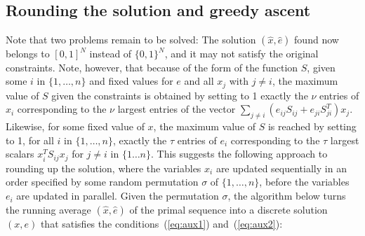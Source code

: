 \documentclass[10pt,twocolumn,letterpaper]{article}
\numberwithin{theorem}{section}
\begin{document}
\subsection{Rounding the solution and greedy ascent}
Note that two problems remain to be solved: The solution $(\hat{x},\hat{e})$ found
now belongs to $[0,1]^N$ instead of $\{0,1\}^N$, and it may not
satisfy the original constraints. Note, however, that because of the
form of the function $S$, given some $i$ in $\{1,\ldots,n\}$ and fixed
values for $e$ and all $x_j$ with $j\neq i$, the maximum value of $S$
given the constraints is obtained by setting to 1 exactly the $\nu$
entries of $x_i$ corresponding to the $\nu$ largest entries of the
vector $\sum_{j\neq i} (e_{ij}S_{ij}+e_{ji}S_{ji}^T)x_j$. Likewise,
for some fixed value of $x$, the maximum value of $S$ is reached by
setting to 1, for all $i$ in $\{1,\ldots,n\}$, exactly the $\tau$ entries of
$e_i$ corresponding to the $\tau$ largest scalars $x_i^TS_{ij}x_j$ for
$j\neq i$ in $\{1\ldots n\}$.  This suggests the following approach to
rounding up the solution, where the variables $x_i$ are updated
sequentially in an order specified by some random permutation $\sigma$ of $\{1,\ldots,n\}$, before the variables $e_i$ are updated in parallel.
Given the permutation $\sigma$, the algorithm
below turns the running average $(\hat{x},\hat{e})$ of the primal sequence into a
discrete solution $(x,e)$ that satisfies the
conditions~(\ref{eq:aux1}) and~(\ref{eq:aux2}):
{}\\
	
\end{document}
